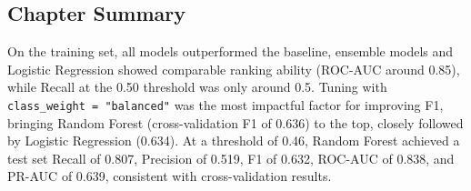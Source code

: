 \subsection{ Chapter Summary}

On the training set, all models outperformed the baseline, ensemble models and Logistic Regression showed comparable ranking ability (ROC-AUC around 0.85), while Recall at the 0.50 threshold was only around 0.5. Tuning with \texttt{class\_weight = "balanced"} was the most impactful factor for improving F1, bringing Random Forest (cross-validation F1 of 0.636) to the top, closely followed by Logistic Regression (0.634). At a threshold of 0.46, Random Forest achieved a test set Recall of 0.807, Precision of 0.519, F1 of 0.632, ROC-AUC of 0.838, and PR-AUC of 0.639, consistent with cross-validation results.
